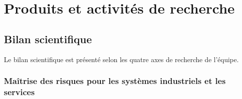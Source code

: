 

  \vfill
\rule[\baselineskip]{0pt}{\baselineskip}
 \section{Produits et activités de recherche}
 	
\subsection{Bilan scientifique}

Le bilan scientifique est présenté selon les quatre axes de recherche de l'équipe. 		

\subsubsection{Maîtrise des risques pour les systèmes industriels et les services}

